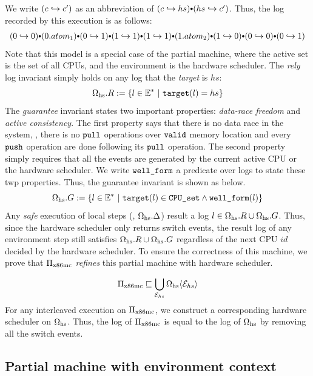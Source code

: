 \noindent
We write $(c \hookrightarrow c')$
as an abbreviation of $(c \switch hs) \cons (hs \switch c')$.
Thus,
the log recorded by this execution is as follows:
\[
\begin{array}{l}
(0\switch 0) \cons (0.atom_1)
\cons (0\switch 1) \cons (1\switch 1)
\cons  (1\switch 1) \cons (1.atom_2)
\cons (1\switch 0) \cons (0\switch 0)
\cons ( 0\switch 1)
\end{array}
\]
\noindent
Note that this model is a special case of the partial
machine,
where the 
active set is the set of all CPUs,
and the environment is the hardware scheduler.
The \emph{rely} log invariant simply holds
on any log that the \emph{target} is $hs$:
\[\pmach{hs}.R := \{ l \in \Ev^* \ |\ \kw{target}(l) = hs \}\]
The \emph{guarantee} invariant states
two important properties:
\emph{data-race freedom}
and \emph{active consistency}.
The first property says
 that there is no
data race in the system,
\ie, there is no ${\texttt{pull}}$ operations over ${\texttt{valid}}$
memory location and every ${\texttt{push}}$ operation
are done following its ${\texttt{pull}}$ operation.
The second property simply
requires that all the events
are generated by the current active CPU or the hardware scheduler.
We write ${\texttt{well\_form}}$ a predicate
over logs to state these twp properties.
Thus, the guarantee invariant is shown as below.
\[\Omega_{\text{hs}}.G := \{ l \in \mathbb{E}^* \ |\ {{\texttt{target}}}(l) \in {\texttt{CPU\_set}}
\land {\texttt{well\_form}}(l) \}\]
Any \emph{safe} execution of  local steps (\ie, $\Omega_{\text{hs}}.\Delta$) result a log $l \in \Omega_{\text{hs}}.R \cup \Omega_{\text{hs}}.G$.
Thus, since the hardware scheduler only returns switch events,
the result log of any environment step still satisfies
$\Omega_{\text{hs}}.R \cup \Omega_{\text{hs}}.G$ regardless
of the next CPU $id$ decided by the hardware scheduler.
To ensure the correctness of this machine,
we prove that $\Pi_{\text{x86mc}}$ \emph{refines} this
partial machine with hardware scheduler.

\begin{lemma}
\[\Pi_{\text{x86mc}} \sqsubseteq \bigcup_{\mathcal{E}_{hs}}{
\Omega_{\text{hs}}\langle \mathcal{E}_{hs} \rangle}
\]
For any interleaved execution on $\Pi_{\text{x86mc}}$, we construct
a corresponding hardware scheduler on $\Omega_{\text{hs}}$.
Thus, the log of $\Pi_{\text{x86mc}}$
is equal to the log of $\Omega_{\text{hs}}$
by removing all the switch events.
 \label{lemma:pboot}
\end{lemma}


\subsection{Partial machine with environment context}

